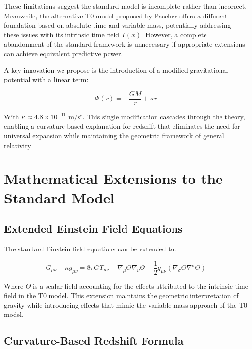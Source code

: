\documentclass[12pt,a4paper]{article}
\newcommand{\Tfield}{T(x)}
\begin{document}
	These limitations suggest the standard model is incomplete rather than incorrect. Meanwhile, the alternative T0 model proposed by Pascher offers a different foundation based on absolute time and variable mass, potentially addressing these issues with its intrinsic time field $\Tfield$. However, a complete abandonment of the standard framework is unnecessary if appropriate extensions can achieve equivalent predictive power.
	
	A key innovation we propose is the introduction of a modified gravitational potential with a linear term:
	
	\begin{equation}
		\Phi(r) = -\frac{GM}{r} + \kappa r
	\end{equation}
	
	With $\kappa \approx 4.8\times10^{-11}$ m/s². This single modification cascades through the theory, enabling a curvature-based explanation for redshift that eliminates the need for universal expansion while maintaining the geometric framework of general relativity.
	
	\section{Mathematical Extensions to the Standard Model}
	
	\subsection{Extended Einstein Field Equations}
	
	The standard Einstein field equations can be extended to:
	
	\begin{equation}
		G_{\mu\nu} + \kappa g_{\mu\nu} = 8\pi G T_{\mu\nu} + \nabla_{\mu}\Theta\nabla_{\nu}\Theta - \frac{1}{2}g_{\mu\nu}(\nabla_{\sigma}\Theta\nabla^{\sigma}\Theta)
	\end{equation}
	
	Where $\Theta$ is a scalar field accounting for the effects attributed to the intrinsic time field in the T0 model. This extension maintains the geometric interpretation of gravity while introducing effects that mimic the variable mass approach of the T0 model.
	
	\subsection{Curvature-Based Redshift Formula}
	
\end{document}

